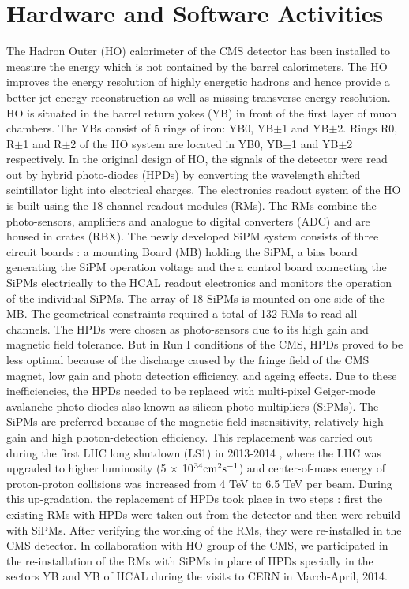 \chapter{Hardware and Software Activities}
\label{chap:Hardware}

The Hadron Outer (HO) calorimeter of the CMS detector has been installed to measure the energy which is not contained by the barrel calorimeters. The HO improves the energy resolution of highly energetic hadrons and hence provide a better jet energy reconstruction as well as missing transverse energy resolution. HO is situated in the barrel return yokes (YB) in front of the first layer of muon chambers. The YBs consist of 5 rings of iron: YB0, YB$\pm$1 and YB$\pm$2. Rings R0, R$\pm$1 and R$\pm$2 of the HO system are located in YB0, YB$\pm$1 and YB$\pm$2 respectively. In the original design of HO, the signals of the detector were read out by hybrid photo-diodes (HPDs) by converting the wavelength shifted scintillator light into electrical charges. The electronics readout system of the HO is built using the 18-channel readout modules (RMs). The RMs combine the photo-sensors, amplifiers and analogue to digital converters (ADC) and are housed in crates (RBX). The newly developed SiPM system consists of three circuit boards : a mounting Board (MB) holding the SiPM, a bias board generating the SiPM operation voltage and the a control board connecting the SiPMs electrically to the HCAL readout electronics and monitors the operation of the individual SiPMs. The array of 18 SiPMs is mounted on one side of the MB. The geometrical constraints required a total of 132 RMs to read all channels. The HPDs were chosen as photo-sensors due to its high gain and magnetic field tolerance. But in Run I conditions of the CMS, HPDs proved to be less optimal because of the discharge caused by the fringe field of the CMS magnet, low gain and photo detection efficiency, and ageing effects. Due to these inefficiencies, the HPDs needed to be replaced with multi-pixel Geiger-mode avalanche photo-diodes also known as silicon photo-multipliers (SiPMs). The SiPMs are preferred because of the magnetic field insensitivity, relatively high gain and high photon-detection efficiency. This replacement was carried out during the first LHC long shutdown (LS1) in 2013-2014 \cite{Lutz:2012yoa}, where the LHC was upgraded to higher luminosity (5 $\times$ 10$^{34} {\rm cm}^2 {\rm s}^{-1}$) and center-of-mass energy of proton-proton collisions was increased from 4 TeV to 6.5 TeV per beam. During this up-gradation, the replacement of HPDs took place in two steps : first the existing RMs with HPDs were taken out from the detector and then were rebuild with SiPMs. After verifying the working of the RMs, they were re-installed in the CMS detector. In collaboration with HO group of the CMS, we participated in the re-installation of the RMs with SiPMs in place of HPDs specially in the sectors YB and YB of HCAL during the visits to CERN in March-April, 2014.

